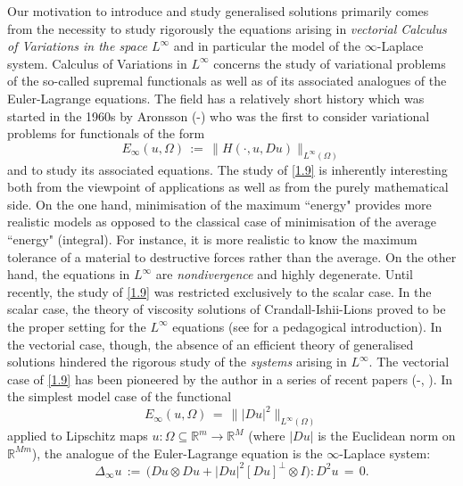 \documentclass{amsart}
\theoremstyle{definition}
\numberwithin{equation}{section}
\begin{document}
Our motivation to introduce and study generalised solutions primarily comes from the necessity to study rigorously the equations arising in \emph{vectorial Calculus of Variations in the space $L^\infty$} and in particular the model of the $\infty$-Laplace system. Calculus of Variations in  $L^\infty$ concerns the study of variational problems of the so-called supremal functionals as well as of its associated analogues of the Euler-Lagrange equations.  The field has a relatively short history which was started in the 1960s by Aronsson (\cite{A1}-\cite{A5}) who was the first to consider variational problems for functionals of the form
\begin{equation}  \label{1.9}
E_\infty(u,{\Omega})\, :=\, \big\| H(\cdot,u,Du) \big\|_{L^\infty({\Omega})}
\end{equation}
and to study its associated equations. The study of \eqref{1.9} is inherently interesting both from the viewpoint of applications as well as from the purely mathematical side. On the one hand, minimisation of the maximum ``energy" provides more realistic models as opposed to the classical case of minimisation of the average ``energy" (integral). For instance, it is more realistic to know the maximum tolerance of a material to destructive forces rather than the average. On the other hand, the equations in $L^\infty$ are \emph{nondivergence} and highly degenerate. Until recently, the study of \eqref{1.9} was restricted exclusively to the scalar case. In the scalar case, the theory of viscosity solutions of Crandall-Ishii-Lions proved to be the proper setting for the $L^\infty$ equations (see \cite{K} for a pedagogical introduction). In the vectorial case, though, the absence of an efficient theory of generalised solutions hindered the rigorous study of the \emph{systems} arising in $L^\infty$. The vectorial case of \eqref{1.9} has been pioneered by the author in a series of recent papers  (\cite{K1}-\cite{K6}, \cite{K8,K9}). In the simplest model case of the functional
\begin{equation}  \label{1.10}
E_\infty(u,{\Omega})\, =\, \big\| |Du|^2 \big\|_{L^\infty({\Omega})}
\end{equation}
applied to Lipschitz maps $u : {\Omega} {\subseteq} {\mathbb{R}}^m {\longrightarrow} {\mathbb{R}}^M$ (where $|Du|$ is the Euclidean norm on ${\mathbb{R}}^{Mm}$), the analogue of the Euler-Lagrange equation is the $\infty$-Laplace system:
\begin{equation} \label{1.11}
{\Delta}_\infty u \, :=\, \Big(Du {\otimes} Du + |Du|^2[Du]^\bot \! {\otimes} I \Big):D^2u\, =\, 0.
\end{equation}
\end{document}

